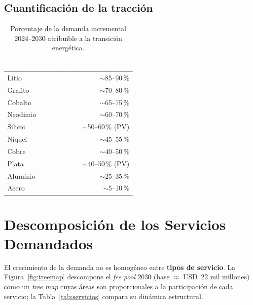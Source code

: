 \documentclass[11pt,letterpaper]{report}
\begin{document}
\section{Cuantificación de la tracción}
\begin{table}[htbp]
\centering
\caption{Porcentaje de la demanda incremental 2024--2030 atribuible a la transición energética.}
\label{tab:traccion-pct}
\footnotesize
\renewcommand{\arraystretch}{1.15}
\begin{tabularx}{0.8\textwidth}{@{}Xr@{}}
\toprule
\rowcolor{tablehead}\textcolor{white}{\textbf{Mineral}} & \textcolor{white}{\textbf{\% atribuible a transición}}\\
\midrule
Litio & $\sim$85--90\,\%\\
\rowcolor{tablealt}Grafito & $\sim$70--80\,\%\\
Cobalto & $\sim$65--75\,\%\\
\rowcolor{tablealt}Neodimio & $\sim$60--70\,\%\\
Silicio & $\sim$50--60\,\% (PV)\\
\rowcolor{tablealt}Níquel & $\sim$45--55\,\%\\
Cobre & $\sim$40--50\,\%\\
\rowcolor{tablealt}Plata & $\sim$40--50\,\% (PV)\\
Aluminio & $\sim$25--35\,\%\\
\rowcolor{tablealt}Acero & $\sim$5--10\,\%\\
\bottomrule
\end{tabularx}
\end{table}

\chapter{Descomposición de los Servicios Demandados}
\label{cap:servicios}
El crecimiento de la demanda no es homogéneo entre \textbf{tipos de servicio}. La Figura~\ref{fig:treemap} descompone el
\emph{fee pool} 2030 (base $\approx$ USD~22 mil millones) como un \emph{tree map} cuyas áreas son proporcionales a la
participación de cada servicio; la Tabla~\ref{tab:servicios} compara su dinámica estructural.
\end{document}
